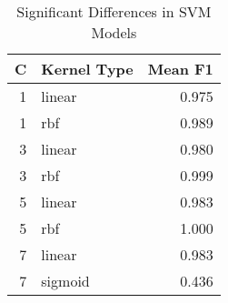 \begin{table}
\centering
\caption{Significant Differences in SVM Models}
\label{tab:svm_significant_pairs_mushroom}
\begin{tabular}{rlr}
\toprule
C & Kernel Type & Mean F1 \\
\midrule
1 & linear & 0.975 \\
1 & rbf & 0.989 \\
3 & linear & 0.980 \\
3 & rbf & 0.999 \\
5 & linear & 0.983 \\
5 & rbf & 1.000 \\
7 & linear & 0.983 \\
7 & sigmoid & 0.436 \\
\bottomrule
\end{tabular}
\end{table}
